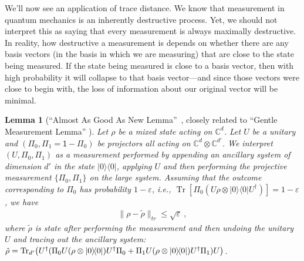 \documentclass[12pt]{report}
\theoremstyle{plain}
\newtheorem{lemma}[theorem]{Lemma}
\theoremstyle{definition}
\newtheorem{definition}[theorem]{Definition}
\newcommand{\C}{{\mathbb C}}
\newcommand{\eps}{\varepsilon}
\newcommand{\ketbra}[2]{|#1\rangle\!\langle#2|}
\newcommand{\proj}[1]{\ketbra{#1}{#1}}
\newcommand{\Tr}{\operatorname{Tr}}
\begin{document}
We'll now see an application of trace distance. We know that measurement in quantum mechanics is an inherently destructive process. Yet, we should not interpret this as saying that every measurement is always maximally destructive. In reality, how destructive a measurement is depends on whether there are any basis vectors (in the basis in which we are measuring) that are close to the state being measured. If the state being measured is close to a basis vector, then with high probability it will collapse to that basis vector---and since those vectors were close to begin with, the loss of information about our original vector will be minimal.



\begin{lemma}[``Almost As Good As New Lemma''~\cite{aar:adv}, closely related to ``Gentle Measurement Lemma'' \cite{gentle}]
\label{lem:aagan}
Let $\rho$ be a mixed state acting on $\C^d$. Let $U$ be a unitary and $(\Pi_0, \Pi_1 = \mathsf{1} - \Pi_0)$ be projectors all acting on $\C^{d} \otimes \C^{d'}$. We interpret $(U, \Pi_0, \Pi_1)$ as a measurement performed by appending an ancillary system of dimension $d'$ in the state $\proj{0}$, applying $U$ and then performing the projective measurement $\{ \Pi_0, \Pi_1\}$ on the large system. Assuming that the outcome corresponding to $\Pi_0$ has probability $1-\eps$, i.e., $\Tr[ \Pi_0 (U \rho \otimes \proj{0} U^{\dagger}) ] = 1 - \eps$, we have
\begin{align*}
\| \rho - \tilde{\rho} \|_{tr} \leq \sqrt{\eps} \ ,
\end{align*}
where $\tilde{\rho}$ is state after performing the measurement and then undoing the unitary $U$ and tracing out the ancillary system: $\tilde{\rho} =  \Tr_{d'}\bigl(U^{\dagger} ( \Pi_0 U (\rho \otimes \proj{0}) U^{\dagger} \Pi_0  +  \penalty-10000 \Pi_1 U (\rho \otimes \proj{0}) U^{\dagger} \Pi_1 ) U \bigr)$.
\end{lemma}
\end{document}
